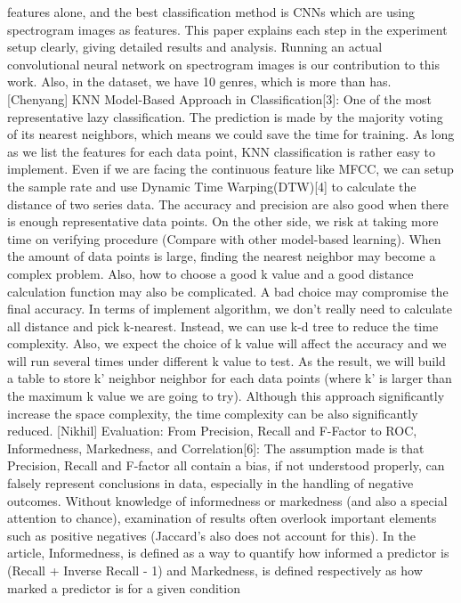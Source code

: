 \documentclass[acmtog, authorversion]{acmart}
\begin{document}
  features alone, and the best classification method is CNNs which are using spectrogram images as features. This paper explains each step in the experiment
   setup clearly, giving detailed results and analysis. Running an actual convolutional neural network on spectrogram images is our contribution to this work.
   Also, in the dataset, we have 10 genres, which is more than \cite{bahuleyan2018music} has.
[Chenyang] KNN Model-Based Approach in Classification[3]: One of the most representative lazy classification. The prediction is made by the majority 
voting of its nearest neighbors, which means we could save the time for training. As long as we list the features for each data point, KNN classification 
is rather easy to implement. Even if we are facing the continuous feature like MFCC, we can setup the sample rate and use Dynamic Time Warping(DTW)[4] to 
calculate the distance of two series data. The accuracy and precision are also good when there is enough representative data points. On the other side, 
we risk at taking more time on verifying procedure (Compare with other model-based learning). When the amount of data points is large, finding the 
nearest neighbor may become a complex problem. Also, how to choose a good k value and a good distance calculation function may also be complicated. A bad 
choice may compromise the final accuracy.
In terms of implement algorithm, we don’t really need to calculate all distance and pick k-nearest. Instead, we can use k-d tree to reduce the time 
complexity. Also, we expect the choice of k value will affect the accuracy and we will run several times under different k value to test. As the result, 
we will build a table to store k’ neighbor neighbor for each data points (where k’ is larger than the maximum k value we are going to try). Although this 
approach significantly increase the space complexity, the time complexity can be also significantly reduced. 
[Nikhil] Evaluation: From Precision, Recall and F-Factor to ROC, Informedness, Markedness, and Correlation[6]: The assumption made is that Precision, 
Recall and F-factor all contain a bias, if not understood properly, can falsely represent conclusions in data, especially in the handling of negative 
outcomes. Without knowledge of informedness or markedness (and also a special attention to chance), examination of results often overlook important 
elements such as positive negatives (Jaccard’s also does not account for this). In the article, Informedness, is defined as a way to quantify how 
informed a predictor is (Recall + Inverse Recall - 1) and Markedness, is defined respectively as how marked a predictor is for a given condition 
\end{document}
